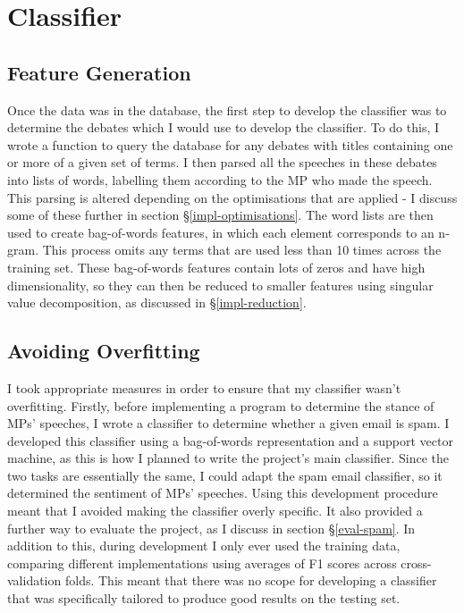 \documentclass[12pt,a4paper,twoside,openright]{report}
\begin{document}
\section{Classifier} \label{impl-classifier}

\subsection{Feature Generation}

Once the data was in the database, the first step to develop the classifier was to determine the debates which I would use to develop the classifier. To do this, I wrote a function to query the database for any debates with titles containing one or more of a given set of terms. I then parsed all the speeches in these debates into lists of words, labelling them according to the MP who made the speech. This parsing is altered depending on the optimisations that are applied - I discuss some of these further in section \S\ref{impl-optimisations}. The word lists are then used to create bag-of-words features, in which each element corresponds to an n-gram. This process omits any terms that are used less than 10 times across the training set. These bag-of-words features contain lots of zeros and have high dimensionality, so they can then be reduced to smaller features using singular value decomposition, as discussed in \S\ref{impl-reduction}.

\subsection{Avoiding Overfitting} \label{impl-overfitting}

I took appropriate measures in order to ensure that my classifier wasn't overfitting. Firstly, before implementing a program to determine the stance of MPs' speeches, I wrote a classifier to determine whether a given email is spam. I developed this classifier using a bag-of-words representation and a support vector machine, as this is how I planned to write the project's main classifier. Since the two tasks are essentially the same, I could adapt the spam email classifier, so it determined the sentiment of MPs' speeches. Using this development procedure meant that I avoided making the classifier overly specific. It also provided a further way to evaluate the project, as I discuss in section \S\ref{eval-spam}. In addition to this, during development I only ever used the training data, comparing different implementations using averages of F1 scores across cross-validation folds. This meant that there was no scope for developing a classifier that was specifically tailored to produce good results on the testing set.
\end{document}
